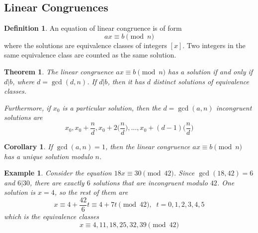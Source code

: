 \documentclass{article}
\newtheorem{theorem}{Theorem}[section]
\newtheorem{example}{Example}[section]
\newtheorem{corollary}{Corollary}[theorem]
\theoremstyle{remark}
\theoremstyle{definition}
\newtheorem{definition}{Definition}[section]
\begin{document}
\subsection{Linear Congruences}
\begin{definition}
An equation of linear congruence is of form 
\[a x \equiv b \pmod{n}\]
where the solutions are equivalence classes of integers $[x]$. Two integers in the same equivalence class are counted as the same solution. 
\end{definition}

\begin{theorem}
The linear congruence $a x \equiv b \pmod{n}$ has a solution if and only if $d|b$, where $d = \gcd(d, n)$. If $d|b$, then it has $d$ distinct solutions of equivalence classes. 

Furthermore, if $x_0$ is a particular solution, then the $d = \gcd(a, n)$ incongruent solutions are
\[x_0, x_0 + \frac{n}{d}, x_0 + 2 \Big( \frac{n}{d} \Big), ..., x_0 + (d-1) \Big( \frac{n}{d} \Big)\]
\end{theorem}

\begin{corollary}
If $\gcd(a, n) = 1$, then the linear congruence $a x \equiv b \pmod{n}$ has a unique solution modulo $n$. 
\end{corollary}

\begin{example}
Consider the equation $18 x \equiv 30 \pmod{42}$. Since $\gcd(18,42) = 6$ and $6 |30$, there are exactly $6$ solutions that are incongruent modulo $42$. One solution is $x = 4$, so the rest of them are 
\[x \equiv 4 + \frac{42}{6} t \equiv 4 + 7t \pmod{42}, \;\; t = 0, 1, 2, 3, 4, 5\]
which is the equivalence classes
\[x \equiv 4, 11, 18, 25, 32, 39 \pmod{42}\]
\end{example}
\end{document}

